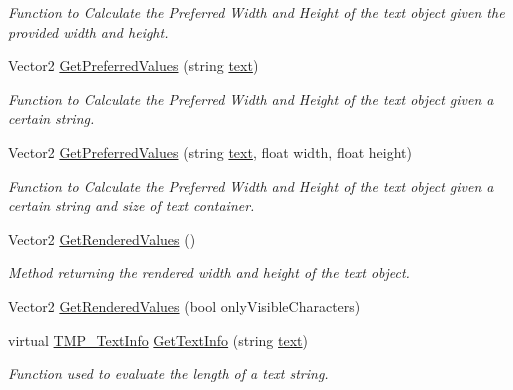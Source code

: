 \begin{DoxyCompactItemize}
\begin{DoxyCompactList}\small\item\em Function to Calculate the Preferred Width and Height of the text object given the provided width and height. \end{DoxyCompactList}\item 
Vector2 \mbox{\hyperlink{class_t_m_pro_1_1_t_m_p___text_a039a0f623414b9972e2e123a81ddc003}{Get\+Preferred\+Values}} (string \mbox{\hyperlink{class_t_m_pro_1_1_t_m_p___text_a98a04e5078612c0586472bd510f91f5c}{text}})
\begin{DoxyCompactList}\small\item\em Function to Calculate the Preferred Width and Height of the text object given a certain string. \end{DoxyCompactList}\item 
Vector2 \mbox{\hyperlink{class_t_m_pro_1_1_t_m_p___text_a5bad2f9a6312f25cc94280a90b61f864}{Get\+Preferred\+Values}} (string \mbox{\hyperlink{class_t_m_pro_1_1_t_m_p___text_a98a04e5078612c0586472bd510f91f5c}{text}}, float width, float height)
\begin{DoxyCompactList}\small\item\em Function to Calculate the Preferred Width and Height of the text object given a certain string and size of text container. \end{DoxyCompactList}\item 
Vector2 \mbox{\hyperlink{class_t_m_pro_1_1_t_m_p___text_aac1235e0778a66ae1cf9c174196171c5}{Get\+Rendered\+Values}} ()
\begin{DoxyCompactList}\small\item\em Method returning the rendered width and height of the text object. \end{DoxyCompactList}\item 
Vector2 \mbox{\hyperlink{class_t_m_pro_1_1_t_m_p___text_a47a974ab674a361f2351ff8bf7e0da22}{Get\+Rendered\+Values}} (bool only\+Visible\+Characters)
\item 
virtual \mbox{\hyperlink{class_t_m_pro_1_1_t_m_p___text_info}{T\+M\+P\+\_\+\+Text\+Info}} \mbox{\hyperlink{class_t_m_pro_1_1_t_m_p___text_a6818c7aebeca52a9e5205ec1225481c6}{Get\+Text\+Info}} (string \mbox{\hyperlink{class_t_m_pro_1_1_t_m_p___text_a98a04e5078612c0586472bd510f91f5c}{text}})
\begin{DoxyCompactList}\small\item\em Function used to evaluate the length of a text string. \end{DoxyCompactList}\item 

\end{DoxyCompactItemize}
